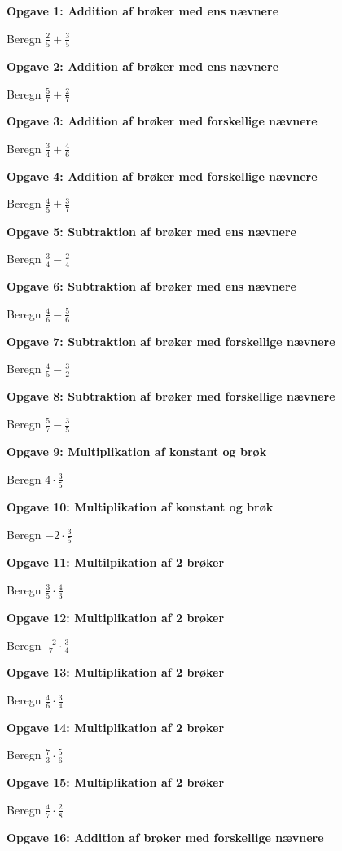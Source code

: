 \textbf{Opgave 1: Addition af brøker med ens nævnere}

Beregn $\frac{2}{5} + \frac{3}{5}$

\textbf{Opgave 2: Addition af brøker med ens nævnere}

Beregn $\frac{5}{7} + \frac{2}{7}$

\textbf{Opgave 3: Addition af brøker med forskellige nævnere}

Beregn $\frac{3}{4} + \frac{4}{6}$

\textbf{Opgave 4: Addition af brøker med forskellige nævnere}

Beregn $\frac{4}{5} + \frac{3}{7}$

\textbf{Opgave 5: Subtraktion af brøker med ens nævnere}

Beregn $\frac{3}{4} - \frac{2}{4}$

\textbf{Opgave 6: Subtraktion af brøker med ens nævnere}

Beregn $\frac{4}{6} - \frac{5}{6}$

\textbf{Opgave 7: Subtraktion af brøker med forskellige nævnere}

Beregn $\frac{4}{5} - \frac{3}{2}$

\textbf{Opgave 8: Subtraktion af brøker med forskellige nævnere}

Beregn $\frac{5}{7} - \frac{3}{5}$

\textbf{Opgave 9: Multiplikation af konstant og brøk}

Beregn $4 \cdot \frac{3}{5}$

\textbf{Opgave 10: Multiplikation af konstant og brøk}

Beregn $-2 \cdot \frac{3}{5}$

\textbf{Opgave 11: Multilpikation af 2 brøker}

Beregn $\frac{3}{5}\cdot \frac{4}{3}$

\textbf{Opgave 12: Multiplikation af 2 brøker}

Beregn $\frac{-2}{7} \cdot \frac{3}{4}$

\textbf{Opgave 13: Multiplikation af 2 brøker}

Beregn $\frac{4}{6} \cdot \frac{3}{4}$

\textbf{Opgave 14: Multiplikation af 2 brøker}

Beregn $\frac{7}{3} \cdot \frac{5}{6}$

\textbf{Opgave 15: Multiplikation af 2 brøker}

Beregn $\frac{4}{7} \cdot \frac{2}{8}$

\textbf{Opgave 16: Addition af brøker med forskellige nævnere}


